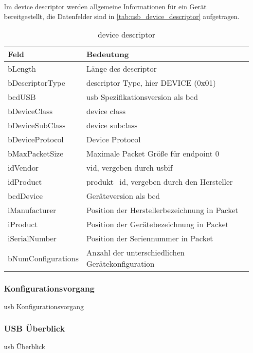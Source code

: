 Im  device descriptor werden allgemeine Informationen für ein Gerät bereitgestellt, die Datenfelder sind in \autoref{tab:usb_device_descriptor} aufgetragen. %
\begin{table}[h]
    \centering
    \begin{tabular}{|l|l|}
        \hline
        \textbf{Feld}      & \textbf{Bedeutung}                                 \\
        \hline
        bLength            & Länge des descriptor               \\
        \hline
        bDescriptorType    & descriptor Type, hier DEVICE (0x01)                 \\
        \hline
        bcdUSB             & \acrshort{usb} Spezifikationsversion als \acrshort{bcd}                   \\
        \hline
        bDeviceClass       & device class                                       \\
        \hline
        bDeviceSubClass    & device subclass                                    \\
        \hline
        bDeviceProtocol    & Device Protocol                                    \\
        \hline
        bMaxPacketSize     & Maximale Packet Größe für endpoint 0               \\
        \hline
        idVendor           & \acrfull{vid}, vergeben durch \acrshort{usbif}        \\ %
        \hline
        idProduct          & \acrfull{produkt_id}, vergeben durch den Hersteller   \\
        \hline
        bcdDevice          & Geräteversion als \acrshort{bcd}                              \\
        \hline
        iManufacturer      & Position der Herstellerbezeichnung in Packet       \\
        \hline
        iProduct           & Position der Gerätebezeichnung in Packet           \\
        \hline
        iSerialNumber      & Position der Seriennummer in Packet                \\
        \hline
        bNumConfigurations & Anzahl der unterschiedlichen Gerätekonfiguration   \\
        \hline
    \end{tabular}
    \caption{device descriptor}
    \label{tab:usb_device_descriptor} %
\end{table}


\subsubsection{Konfigurationsvorgang} \label{sssec:Konfigurationsvorgang}

\acrshort{usb} Konfigurationsvorgang

\subsubsection{USB Überblick} \label{sssec:usb_ueberblick}

\acrshort{usb} Überblick
